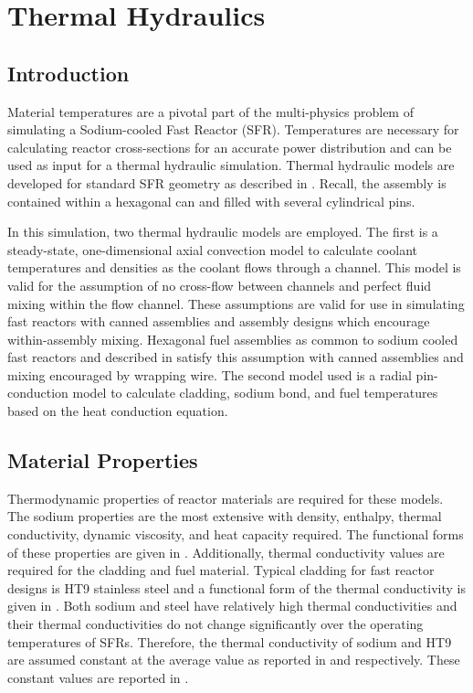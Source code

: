 \chapter{Thermal Hydraulics}
\label{ch:thermalHydraulics}

\section{Introduction}
  Material temperatures are a pivotal part of the multi-physics problem of
  simulating a Sodium-cooled Fast Reactor (SFR). Temperatures are necessary for
  calculating reactor cross-sections for an accurate power distribution and can
  be used as input for a thermal hydraulic simulation. Thermal hydraulic models
  are developed for standard SFR geometry as described in
  . Recall, the assembly is contained within a
  hexagonal can and filled with several cylindrical pins. 

  In this simulation, two thermal hydraulic models are
  employed. The first is a steady-state, one-dimensional axial convection model
  to calculate coolant temperatures and densities as the coolant flows through
  a channel. This
  model is valid for the assumption of no cross-flow between channels and 
  perfect fluid mixing within the flow channel. These assumptions are valid for
  use in simulating fast reactors with canned assemblies and assembly designs
  which encourage within-assembly mixing. Hexagonal fuel assemblies as common to
  sodium cooled fast reactors and described in 
  satisfy this assumption with canned assemblies and mixing encouraged by
  wrapping wire. The second model used is
  a radial pin-conduction model to calculate cladding, sodium bond, and fuel 
  temperatures based on the heat conduction equation.

\section{Material Properties}
  Thermodynamic properties of reactor materials are required for these models.
  The sodium properties are the most extensive with density, enthalpy, 
  thermal conductivity, dynamic viscosity, and heat capacity required. The 
  functional forms of these properties are given in 
  \cite{sodiumProp}. Additionally, thermal conductivity values are required for 
  the cladding and fuel material. Typical cladding for fast reactor designs is 
  HT9 stainless steel and a functional form of the thermal conductivity is given
  in \cite{ht9Prop}. Both sodium and steel have relatively high thermal
  conductivities and their thermal conductivities do not change significantly
  over the operating temperatures of SFRs. Therefore, the thermal conductivity
  of sodium and HT9 are assumed constant at the average value as reported in
  \cite{sodiumProp} and \cite{ht9Prop} respectively. These constant values are
  reported in .
    
